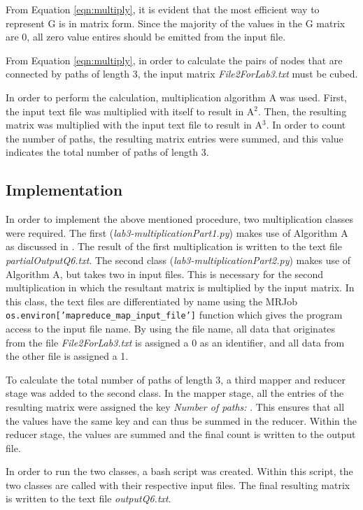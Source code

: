 \documentclass[10pt,twocolumn]{witseiepaper}
\begin{document}
From Equation \ref{eqn:multiply}, it is evident that the most efficient way to represent G is in matrix form. Since the majority of the values in the G matrix are 0, all zero value entires should be emitted from the input file.

From Equation \ref{eqn:multiply}, in order to calculate the pairs of nodes that are connected by paths of length 3, the input matrix \textit{File2ForLab3.txt} must be cubed.

In order to perform the calculation, multiplication algorithm A was used. First, the input text file was multiplied with itself to result in A$^{2}$. Then, the resulting matrix was multiplied with the input text file to result in A$^{3}$. In order to count the number of paths, the resulting matrix entries were summed, and this value indicates the total number of paths of length 3.

\subsection{Implementation} 
In order to implement the above mentioned procedure, two multiplication classes were required. The first (\textit{lab3-multiplicationPart1.py}) makes use of Algorithm A as discussed in . The result of the first multiplication is written to the text file \textit{partialOutputQ6.txt}. The second class (\textit{lab3-multiplicationPart2.py}) makes use of Algorithm A, but takes two in input files. This is necessary for the second multiplication in which the resultant matrix is multiplied by the input matrix. In this class, the text files are differentiated by name using the MRJob \texttt{os.environ['mapreduce\_map\_input\_file']} function which gives the program access to the input file name. By using the file name, all data that originates from the file \textit{File2ForLab3.txt} is assigned a 0 as an identifier, and all data from the other file is assigned a 1.

To calculate the total number of paths of length 3, a third mapper and reducer stage was added to the second class. In the mapper stage, all the entries of the resulting matrix were assigned the key \textit{Number of paths: }. This ensures that all the values have the same key and can thus be summed in the reducer. Within the reducer stage, the values are summed and the final count is written to the output file.

In order to run the two classes, a bash script was created. Within this script, the two classes are called with their respective input files. The final resulting matrix is written to the text file \textit{outputQ6.txt}. 
\end{document}
